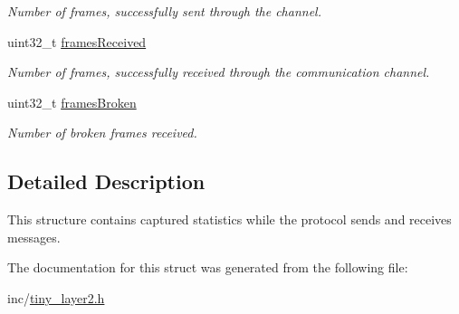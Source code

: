 \begin{DoxyCompactItemize}
\begin{DoxyCompactList}\small\item\em Number of frames, successfully sent through the channel. \end{DoxyCompactList}\item 
\hypertarget{structSTinyStats_a19dfd3a62dbb9d86f6fb77eb1ea6f871}{}uint32\+\_\+t \hyperlink{structSTinyStats_a19dfd3a62dbb9d86f6fb77eb1ea6f871}{frames\+Received}\label{structSTinyStats_a19dfd3a62dbb9d86f6fb77eb1ea6f871}

\begin{DoxyCompactList}\small\item\em Number of frames, successfully received through the communication channel. \end{DoxyCompactList}\item 
\hypertarget{structSTinyStats_abe4f4a9455b532e22f29e60789386130}{}uint32\+\_\+t \hyperlink{structSTinyStats_abe4f4a9455b532e22f29e60789386130}{frames\+Broken}\label{structSTinyStats_abe4f4a9455b532e22f29e60789386130}

\begin{DoxyCompactList}\small\item\em Number of broken frames received. \end{DoxyCompactList}\end{DoxyCompactItemize}


\subsection{Detailed Description}
This structure contains captured statistics while the protocol sends and receives messages. 

The documentation for this struct was generated from the following file\+:\begin{DoxyCompactItemize}
\item 
inc/\hyperlink{tiny__layer2_8h}{tiny\+\_\+layer2.\+h}\end{DoxyCompactItemize}
